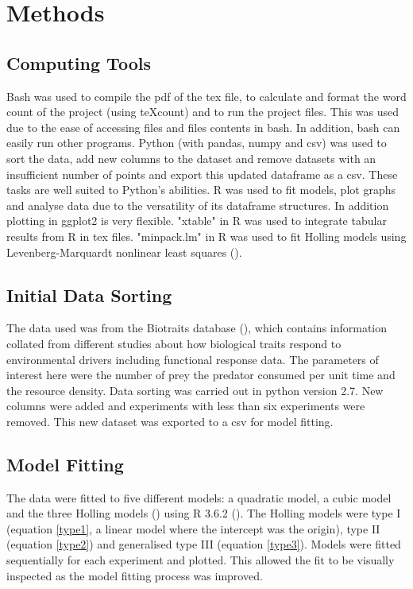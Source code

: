 \documentclass{article}
\begin{document}
\section{Methods}
\subsection{Computing Tools}
Bash was used to compile the pdf of the tex file, to calculate and format the word count of the project (using teXcount) and to run the project files. This was used due to the ease of accessing files and files contents in bash. In addition, bash can easily run other programs.
Python (with pandas, numpy and csv) was used to sort the data, add new columns to the dataset and remove datasets with an insufficient number of points and export this updated dataframe as a csv. These tasks are well suited to Python's abilities.
R was used to fit models, plot graphs and analyse data due to the versatility of its dataframe structures. In addition plotting in ggplot2 is very flexible. "xtable" in R was used to  integrate tabular results from R in tex files. "minpack.lm" in R was used to fit Holling models using Levenberg-Marquardt nonlinear least squares (\cite{Elzhov2016}).
\subsection{Initial Data Sorting}
The data used was from the Biotraits database (\cite{Dell2013}), which contains information collated from different studies about how biological traits respond to environmental drivers including functional response data. The parameters of interest here were the number of prey the predator consumed per unit time and the resource density. Data sorting was carried out in python version 2.7. New columns were added and experiments with less than six experiments were removed. This new dataset was exported to a csv for model fitting.
\subsection{Model Fitting}
The data were fitted to five different models: a quadratic model, a cubic model and the three Holling models (\cite{Holling1959}) using R 3.6.2 (\cite{RCoreTeam2017}). The Holling models were type I  (equation \ref{type1}, a linear model where the intercept was the origin), type II  (equation \ref{type2}) and generalised type III (equation \ref{type3}). Models were fitted sequentially for each experiment and plotted. This allowed the fit to be visually inspected as the model fitting process was improved.
\end{document}

